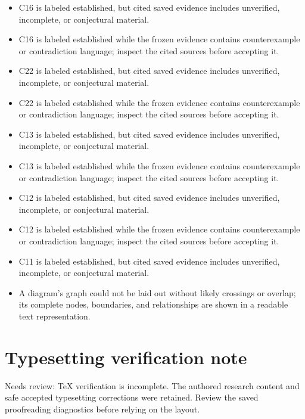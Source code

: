 \documentclass[11pt]{article}
\begin{document}
\begin{itemize}
\item C16 is labeled established, but cited saved evidence includes unverified, incomplete, or conjectural material.
\item C16 is labeled established while the frozen evidence contains counterexample or contradiction language; inspect the cited sources before accepting it.
\item C22 is labeled established, but cited saved evidence includes unverified, incomplete, or conjectural material.
\item C22 is labeled established while the frozen evidence contains counterexample or contradiction language; inspect the cited sources before accepting it.
\item C13 is labeled established, but cited saved evidence includes unverified, incomplete, or conjectural material.
\item C13 is labeled established while the frozen evidence contains counterexample or contradiction language; inspect the cited sources before accepting it.
\item C12 is labeled established, but cited saved evidence includes unverified, incomplete, or conjectural material.
\item C12 is labeled established while the frozen evidence contains counterexample or contradiction language; inspect the cited sources before accepting it.
\item C11 is labeled established, but cited saved evidence includes unverified, incomplete, or conjectural material.
\item A diagram's graph could not be laid out without likely crossings or overlap; its complete nodes, boundaries, and relationships are shown in a readable text representation.
\end{itemize}
\section*{Typesetting verification note}
Needs review: TeX verification is incomplete. The authored research content and safe accepted typesetting corrections were retained. Review the saved proofreading diagnostics before relying on the layout.
\end{document}

